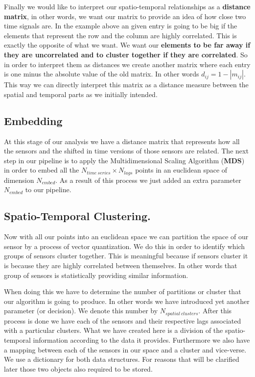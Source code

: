 \documentclass[11pt,a4paper]{article}
\begin{document}
Finally we would like to interpret our spatio-temporal relationships as
a \textbf{distance matrix}, in other words, we want our matrix to provide an idea of how close two time signals are. In the example above an given entry is going to be
big if the elements that represent the row and the column are highly
correlated. This is exactly the opposite of what we want. We want our
\textbf{elements to be far away if they are uncorrelated and to cluster
together if they are correlated}. So in order to interpret them as
distances we create another matrix where each entry is one minus the
absolute value of the old matrix. In other words $d_{ij} = 1 - | m_{ij}|$. This way we can directly interpret
this matrix as a distance measure between the spatial and temporal parts
as we initially intended.

\subsection{Embedding}\label{embedding}

At this stage of our analysis we have a distance matrix that represents
how all the sensors and the shifted in time versions of those sensors
are related. The next step in our pipeline is to apply the Multidimensional
Scaling Algorithm (\textbf{MDS}) in order to embed all the $N_{time\:
series} \times N_{lags}$ points in an euclidean space of dimension
$N_{embed}$. As a result of this process we just added an extra parameter $N_{embed}$ to our pipeline. 

\subsection{Spatio-Temporal Clustering.} \label{spatial-temporal-clustering.}

Now with all our points into an euclidean space we can partition the space of our sensor by a process of vector quantization. We do this in order to identify which groups of sensors cluster together. This is meaningful because if sensors cluster it is because they are highly correlated between themselves. In other words that group of sensors is statistically providing similar information. 

When doing this we have to
determine the number of partitions or cluster that our algorithm is going to produce. In other words we have introduced yet another parameter (or decision). We denote this number by  $N_{spatial\: clusters}$. After this process is
done we have each of the sensors and their respective lags associated
with a particular clusters. What we have created here is a
division of the spatio-temporal information according to the data it
provides. Furthermore we also have a mapping between each of the sensors in our space and a cluster and vice-verse. We use a dictionary for both data structures. For reasons that will be clarified later those two objects also required to be stored. 
\end{document}
